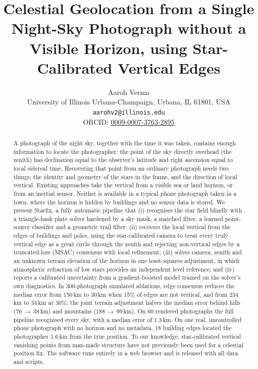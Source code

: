 \documentclass[11pt,a4paper]{article}
\title{\textbf{Celestial Geolocation from a Single Night-Sky Photograph without a Visible Horizon, using Star-Calibrated Vertical Edges}}
\author{Aaroh Verma\\ {\small University of Illinois Urbana-Champaign, Urbana, IL 61801, USA}\\ {\small\texttt{aarohv2@illinois.edu}}\\ {\small ORCID: \href{https://orcid.org/0009-0007-3763-2895}{0009-0007-3763-2895}}}
\date{}
\begin{document}
\maketitle

\begin{abstract}
\noindent A photograph of the night sky, together with the time it was taken, contains enough information to locate the photographer: the point of the sky directly overhead (the zenith) has declination equal to the observer's latitude and right ascension equal to local sidereal time. Recovering that point from an ordinary photograph needs two things: the identity and geometry of the stars in the frame, and the direction of local vertical. Existing approaches take the vertical from a visible sea or land horizon, or from an inertial sensor. Neither is available in a typical phone photograph taken in a town, where the horizon is hidden by buildings and no sensor data is stored. We present Starfix, a fully automatic pipeline that (i) recognises the star field blindly with a triangle-hash plate solver hardened by a sky mask, a matched filter, a learned point-source classifier and a geometric trail filter; (ii) recovers the local vertical from the edges of buildings and poles, using the star-calibrated camera to treat every truly vertical edge as a great circle through the zenith and rejecting non-vertical edges by a truncated-loss (MSAC) consensus with local refinement; (iii) solves camera, zenith and an unknown terrain elevation of the horizon in one least-squares adjustment, in which atmospheric refraction of low stars provides an independent level reference; and (iv) reports a calibrated uncertainty from a gradient-boosted model trained on the solver's own diagnostics. In 300-photograph simulated ablations, edge consensus reduces the median error from 150\,km to 30\,km when 15\% of edges are not vertical, and from 234\,km to 34\,km at 30\%; the joint terrain adjustment halves the median error behind hills (76\,$\to$\,38\,km) and mountains (188\,$\to$\,99\,km). On 60 rendered photographs the full pipeline recognised every sky, with a median error of 1.3\,km. On one real, uncontrolled phone photograph with no horizon and no metadata, 18 building edges located the photographer 1.6\,km from the true position. To our knowledge, star-calibrated vertical vanishing points from man-made structure have not previously been used for a celestial position fix. The software runs entirely in a web browser and is released with all data and scripts.
\end{abstract}
\end{document}
